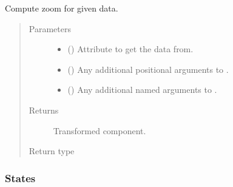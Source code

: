 \documentclass[letterpaper,10pt,english]{sphinxmanual}
\begin{document}
\begin{fulllineitems}
\begin{fulllineitems}
\label{\detokenize{api/rock:geology.src.Rock.zoom}}
Compute zoom for given data.
\begin{quote}\begin{description}
\item[{Parameters}] \leavevmode\begin{itemize}
\item {} 
 (\sphinxstyleliteralemphasis{\sphinxupquote{, }}) \textendash{} Attribute to get the data from.

\item {} 
 () \textendash{} Any additional positional arguments to .

\item {} 
 () \textendash{} Any additional named arguments to .

\end{itemize}

\item[{Returns}] \leavevmode
{} \textendash{} Transformed component.

\item[{Return type}] \leavevmode
{\hyperref[\detokenize{api/base_classes:geology.src.base_spatial.SpatialComponent}]{}}

\end{description}\end{quote}

\end{fulllineitems}


\end{fulllineitems}



\subsubsection{States}
\label{\detokenize{api/states:states}}\label{\detokenize{api/states::doc}}
\end{document}
